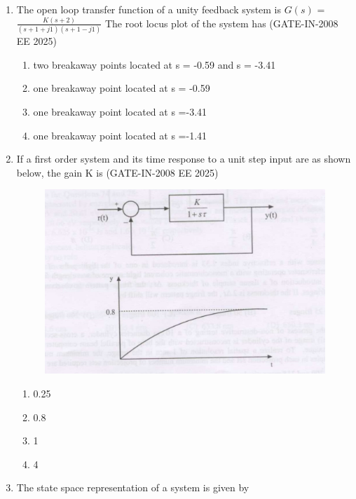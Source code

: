 \documentclass[journal,12pt,onecolumn]{IEEEtran}
\theoremstyle{remark}
\begin{document}
\begin{enumerate}[label=Q.\arabic*,start=1]
\item The open loop transfer function of a unity feedback system is $G(s)$ =$\frac{K(s+2)}{(s+1+j1)(s+1-j1)}$ The root locus plot of the system has (GATE-IN-2008 EE 2025)
           \begin{enumerate} 
              \item two breakaway points located at s = -0.59 and s = -3.41 
              \item one breakaway point located at s = -0.59
              \item one breakaway point located at s =-3.41
              \item one breakaway point located at s =-1.41
            \end{enumerate}

\item If a first order system and its time response to a unit step input are as shown below, the gain K is (GATE-IN-2008 EE 2025)
\begin{figure}[H]
    \centering
    \includegraphics[width=0.5\linewidth]{figs/i29.jpg}
    \label{fig:placeholder29}
\end{figure}
           \begin{enumerate} 
              \item 0.25           
              \item 0.8
              \item 1
              \item 4
            \end{enumerate}

\item The state space representation of a system is given by \


\end{enumerate}
\end{document}
